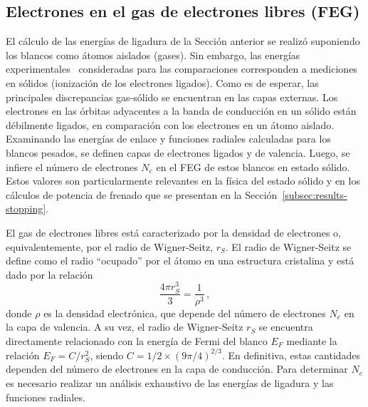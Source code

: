\subsection{Electrones en el gas de electrones libres (FEG)}
\label{subsec:FEG}

El cálculo de las energías de ligadura de la Sección anterior se realizó 
suponiendo los blancos como átomos aislados (gases). Sin embargo, las 
energías experimentales~\cite{Williams:95} consideradas para las 
comparaciones corresponden a mediciones en sólidos (ionización de los 
electrones ligados). Como es de esperar, las principales discrepancias 
gas-sólido se encuentran en las capas externas. Los electrones en las 
órbitas adyacentes a la banda de conducción en un sólido están 
débilmente ligados, en comparación con los electrones en un átomo 
aislado. Examinando las energías de enlace y funciones radiales 
calculadas para los blancos pesados, se definen capas de electrones 
ligados y de valencia. Luego, se infiere el número de electrones $N_e$ 
en el FEG de estos blancos en estado sólido. Estos valores son 
particularmente relevantes en la física del estado sólido y en los 
cálculos de potencia de frenado que se presentan en la 
Sección~\ref{subsec:results-stopping}.

El gas de electrones libres está caracterizado por la densidad de 
electrones o, equivalentemente, por el radio de Wigner-Seitz, $r_S$. 
El radio de Wigner-Seitz se define como el radio ``ocupado'' por el 
átomo en una estructura cristalina y está dado por la relación
\begin{equation}
\frac{4\pi r_S^3}{3}=\frac{1}{\rho^3}\,,
\end{equation} 
donde $\rho$ es la densidad electrónica, que depende del número de 
electrones $N_e$ en la capa de valencia. A su vez, el radio de 
Wigner-Seitz $r_S$ se encuentra directamente relacionado con la energía 
de Fermi del blanco $E_F$ mediante la relación $E_F=C/r_S^{2}$, siendo 
$C=1/2\times(9\pi/4)^{2/3}$. 
En definitiva, estas cantidades dependen del número de electrones en la 
capa de conducción. Para determinar $N_e$ es necesario realizar un 
análisis exhaustivo de las energías de ligadura y las funciones radiales.


